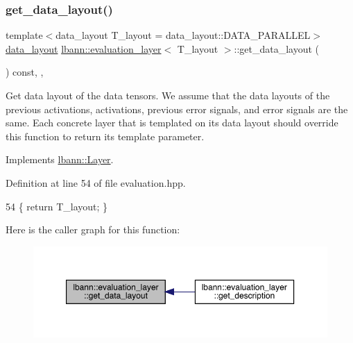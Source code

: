 \mbox{\label{classlbann_1_1evaluation__layer_af8a630d75b1aacc1ffc446d1c141d807}} 
\subsubsection{\texorpdfstring{get\+\_\+data\+\_\+layout()}{get\_data\_layout()}}
{\footnotesize\ttfamily template$<$data\+\_\+layout T\+\_\+layout = data\+\_\+layout\+::\+D\+A\+T\+A\+\_\+\+P\+A\+R\+A\+L\+L\+EL$>$ \\
\hyperlink{base_8hpp_a786677cbfb3f5677b4d84f3056eb08db}{data\+\_\+layout} \hyperlink{classlbann_1_1evaluation__layer}{lbann\+::evaluation\+\_\+layer}$<$ T\+\_\+layout $>$\+::get\+\_\+data\+\_\+layout (\begin{DoxyParamCaption}{ }\end{DoxyParamCaption}) const\hspace{0.3cm}{\ttfamily [inline]}, {\ttfamily [override]}, {\ttfamily [virtual]}}

Get data layout of the data tensors. We assume that the data layouts of the previous activations, activations, previous error signals, and error signals are the same. Each concrete layer that is templated on its data layout should override this function to return its template parameter. 

Implements \hyperlink{classlbann_1_1Layer_a5dfb66e81fc085997402a5e2241316bd}{lbann\+::\+Layer}.



Definition at line 54 of file evaluation.\+hpp.


\begin{DoxyCode}
54 \{ \textcolor{keywordflow}{return} T\_layout; \}
\end{DoxyCode}
Here is the caller graph for this function\+:\nopagebreak
\begin{figure}[H]
\begin{center}
\leavevmode
\includegraphics[width=350pt]{classlbann_1_1evaluation__layer_af8a630d75b1aacc1ffc446d1c141d807_icgraph}
\end{center}
\end{figure}
\mbox{\label{classlbann_1_1evaluation__layer_ac98eda59f9c45455f0f35f85cbd08a9b}} 
